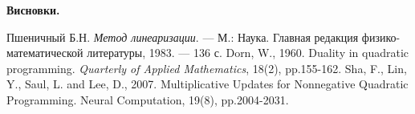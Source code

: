 \documentclass{extreport}
\begin{document}
%

%

\noindent\textbf{Висновки.}

\begin{thebibliography}{3}
     Пшеничный Б.Н. \emph{Метод линеаризации}. --- М.: Наука. Главная редакция физико-математической литературы, 1983. --- 136 с.
     Dorn, W., 1960. Duality in quadratic programming. \emph{Quarterly of Applied Mathematics}, 18(2), pp.155-162.
     Sha, F., Lin, Y., Saul, L. and Lee, D., 2007. Multiplicative Updates for Nonnegative Quadratic Programming. Neural Computation, 19(8), pp.2004-2031.
\end{thebibliography}
\end{document}

